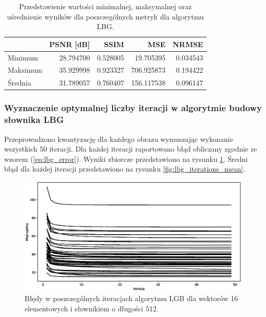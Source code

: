 \documentclass{article}
\begin{document}
\begin{table}[H]
  \caption{Przedstawienie wartości minimalnej, maksymalnej oraz uśrednienie wyników dla poszczególnych metryk dla algorytmu LBG.}
  \label{tab:lbg_summary}
  \centering
  \begin{tabular}{@{}lrrrr@{}}
    \toprule
             & PSNR {[}dB{]} & SSIM     & MSE        & NRMSE    \\ \midrule
    Minimum  & 28.794700     & 0.528005 & 19.705395  & 0.034543 \\
    Maksimum & 35.929998     & 0.923327 & 706.925873 & 0.194422 \\
    Średnia  & 31.789057     & 0.760407 & 156.117538 & 0.096147 \\
    \bottomrule
  \end{tabular}
\end{table}

\FloatBarrier

\subsubsection{Wyznaczenie optymalnej liczby iteracji w algorytmie budowy słownika LBG}

Przeprowadzono kwantyzację dla każdego obrazu wymuszając wykonanie wszystkich $50$ iteracji. Dla każdej iteracji raportowano błąd obliczany zgodnie ze wzorem (\ref{eq:lbg_error}). Wyniki zbiorcze przedstawiono na rysunku \ref{fig:lbg_iterations}. Średni błąd dla każdej iteracji przedstawiono na rysunku \ref{fig:lbg_iterations_mean}.

\begin{figure}[H]
  \centering
  \centering
  \includegraphics[width=.9\linewidth]{images/lbg_4x4_32_50_iterations.eps}
  \caption{Błędy w poszczególnych iteracjach algorytmu LGB dla wektorów 16 elementowych i słownikiem o długości 512.}
  \label{fig:lbg_iterations}
\end{figure}
\end{document}
